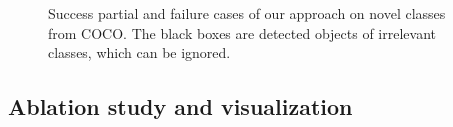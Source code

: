 {\begin{figure}[!ht]
{\begin{tabular}{ccccccc}
	\end{tabular}}
    \caption{Success partial and failure cases of our approach on novel classes from COCO. The black boxes are detected objects of irrelevant classes, which can be ignored. \vspace{1mm}}
    \label{fig:det-vis}
\end{figure}}



\subsection{Ablation study and visualization}
\label{sec:vis}

